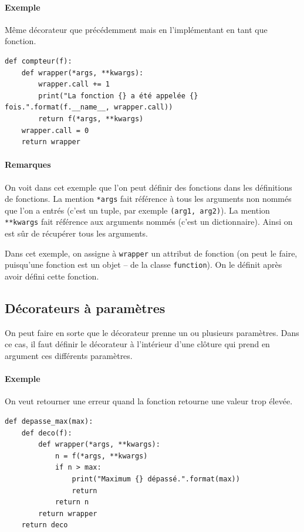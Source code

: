 \documentclass[a4paper, french, 10pt]{article}
\newcommand{\code}[1]{{\small\texttt{#1}}}
\begin{document}
\paragraph{Exemple} Même décorateur que précédemment mais en l'implémentant en tant que fonction.
\begin{verbatim}
def compteur(f):
    def wrapper(*args, **kwargs):
        wrapper.call += 1
        print("La fonction {} a été appelée {} fois.".format(f.__name__, wrapper.call))
        return f(*args, **kwargs)
    wrapper.call = 0
    return wrapper
\end{verbatim}
\paragraph{Remarques} On voit dans cet exemple que l'on peut définir des fonctions dans les définitions de fonctions. La mention \code{*args} fait référence à tous les arguments non nommés que l'on a entrés (c'est un tuple, par exemple \code{(arg1, arg2)}). La mention \code{**kwargs} fait référence aux arguments nommés (c'est un dictionnaire). Ainsi on est sûr de récupérer tous les arguments.\bigskip

Dans cet exemple, on assigne à \code{wrapper} un attribut de fonction (on peut le faire, puisqu'une fonction est un objet -- de la classe \code{function}). On le définit après avoir défini cette fonction.

\subsection{Décorateurs à paramètres}
On peut faire en sorte que le décorateur prenne un ou plusieurs paramètres. Dans ce cas, il faut définir le décorateur à l'intérieur d'une clôture qui prend en argument ces différents paramètres.

\paragraph{Exemple} On veut retourner une erreur quand la fonction retourne une valeur trop élevée.
\begin{verbatim}
def depasse_max(max):
    def deco(f):
        def wrapper(*args, **kwargs):
            n = f(*args, **kwargs)
            if n > max:
                print("Maximum {} dépassé.".format(max))
                return
            return n
        return wrapper
    return deco
\end{verbatim}
\end{document}
